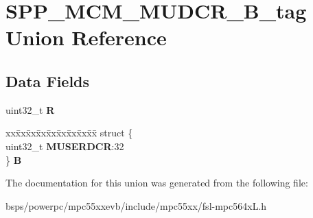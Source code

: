 \hypertarget{unionSPP__MCM__MUDCR__32B__tag}{}\section{S\+P\+P\+\_\+\+M\+C\+M\+\_\+\+M\+U\+D\+C\+R\+\_\+B\+\_\+tag Union Reference}
\label{unionSPP__MCM__MUDCR__32B__tag}
\subsection*{Data Fields}
\begin{DoxyCompactItemize}
\item 
\mbox{\label{unionSPP__MCM__MUDCR__32B__tag_a7400d844848d884abe437d7cffcd8ce9}} 
uint32\+\_\+t {\bfseries R}
\item 
\mbox{\label{unionSPP__MCM__MUDCR__32B__tag_ab4f29f92ece096648963a504b88da0e1}} 
\begin{tabbing}
xx\=xx\=xx\=xx\=xx\=xx\=xx\=xx\=xx\=\kill
struct \{\\
\>uint32\_t {\bfseries MUSERDCR}:32\\
\} {\bfseries B}\\

\end{tabbing}\end{DoxyCompactItemize}


The documentation for this union was generated from the following file\+:\begin{DoxyCompactItemize}
\item 
bsps/powerpc/mpc55xxevb/include/mpc55xx/fsl-\/mpc564x\+L.\+h\end{DoxyCompactItemize}
